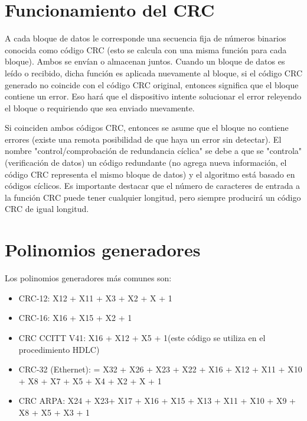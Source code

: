 \documentclass[a4paper,12pt]{article}
\begin{document}
\section{Funcionamiento del CRC}
A cada bloque de datos le corresponde una secuencia fija de números binarios conocida como código CRC (esto se calcula con una misma función para cada bloque). Ambos se envían o almacenan juntos. Cuando un bloque de datos es leído o recibido, dicha función es aplicada nuevamente al bloque, si el código CRC generado no coincide con el código CRC original, entonces significa que el bloque contiene un error. Eso hará que el dispositivo intente solucionar el error releyendo el bloque o requiriendo que sea enviado nuevamente.

Si coinciden ambos códigos CRC, entonces se asume que el bloque no contiene errores (existe una remota posibilidad de que haya un error sin detectar). El nombre "control/comprobación de redundancia cíclica" se debe a que se "controla" (verificación de datos) un código redundante (no agrega nueva información, el código CRC representa el mismo bloque de datos) y el algoritmo está basado en códigos cíclicos. Es importante destacar que el número de caracteres de entrada a la función CRC puede tener cualquier longitud, pero siempre producirá un código CRC de igual longitud.

\section{Polinomios generadores}
Los polinomios generadores más comunes son:

\begin{itemize}
\item CRC-12: X12 + X11 + X3 + X2 + X + 1\\
\item CRC-16: X16 + X15 + X2 + 1\\
\item CRC CCITT V41: X16 + X12 + X5 + 1(este código se utiliza en el procedimiento HDLC)\\
\item CRC-32 (Ethernet): = X32 + X26 + X23 + X22 + X16 + X12 + X11 + X10 + X8 + X7 + X5 + X4 + X2 + X + 1\\
\item CRC ARPA: X24 + X23+ X17 + X16 + X15 + X13 + X11 + X10 + X9 + X8 + X5 + X3 + 1
\end{itemize}
\end{document}
